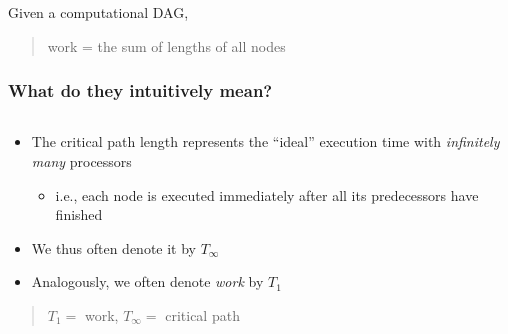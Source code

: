\documentclass[12pt,dvipdfmx]{beamer}
\newcommand{\ao}[1]{{\color{blue}#1}}
\begin{document}
\begin{frame}[fragile]
\begin{columns}[t]
\begin{column}{0.35\textwidth}
\begin{center}
\end{center}
\end{column}
\end{columns}

Given a computational DAG,
\begin{quote}
\ao{work = the sum of lengths of all nodes}
\end{quote}

\end{frame}


\begin{frame}[fragile]
\frametitle{What do they intuitively mean?}
\begin{columns}
\begin{column}{0.7\textwidth}
\begin{itemize}
\item The critical path length represents 
  the ``ideal'' execution time with 
  {\em infinitely many} processors
  \begin{itemize}
  \item i.e., each node is executed immediately after
    all its predecessors have finished
  \end{itemize}

\item We thus often denote it by \ao{$T_\infty$}

\item Analogously, we often denote \ao{\em work} by \ao{$T_1$}
\end{itemize}

\begin{quote}
\ao{$T_1 = $ work, $T_\infty = $ critical path}
\end{quote}
\end{column}


\end{columns}
\end{frame}
\end{document}
